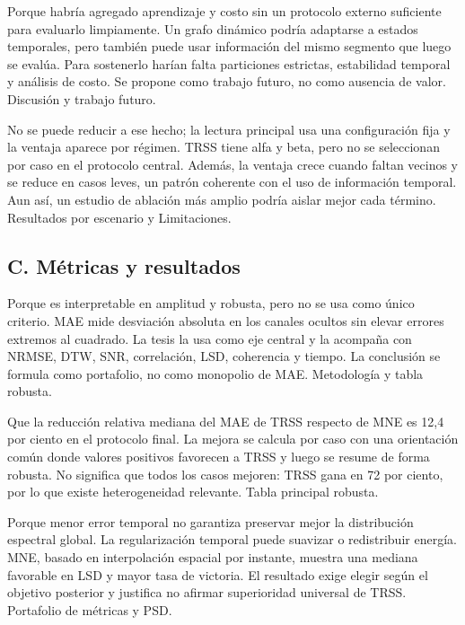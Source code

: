 {Porque habría agregado aprendizaje y costo sin un protocolo externo suficiente para evaluarlo limpiamente.}
{Un grafo dinámico podría adaptarse a estados temporales, pero también puede usar información del mismo segmento que luego se evalúa. Para sostenerlo harían falta particiones estrictas, estabilidad temporal y análisis de costo. Se propone como trabajo futuro, no como ausencia de valor.}
{Discusión y trabajo futuro.}

{No se puede reducir a ese hecho; la lectura principal usa una configuración fija y la ventaja aparece por régimen.}
{TRSS tiene alfa y beta, pero no se seleccionan por caso en el protocolo central. Además, la ventaja crece cuando faltan vecinos y se reduce en casos leves, un patrón coherente con el uso de información temporal. Aun así, un estudio de ablación más amplio podría aislar mejor cada término.}
{Resultados por escenario y Limitaciones.}

\subsection*{C. Métricas y resultados}

{Porque es interpretable en amplitud y robusta, pero no se usa como único criterio.}
{MAE mide desviación absoluta en los canales ocultos sin elevar errores extremos al cuadrado. La tesis la usa como eje central y la acompaña con NRMSE, DTW, SNR, correlación, LSD, coherencia y tiempo. La conclusión se formula como portafolio, no como monopolio de MAE.}
{Metodología y tabla robusta.}

{Que la reducción relativa mediana del MAE de TRSS respecto de MNE es 12,4 por ciento en el protocolo final.}
{La mejora se calcula por caso con una orientación común donde valores positivos favorecen a TRSS y luego se resume de forma robusta. No significa que todos los casos mejoren: TRSS gana en 72 por ciento, por lo que existe heterogeneidad relevante.}
{Tabla principal robusta.}

{Porque menor error temporal no garantiza preservar mejor la distribución espectral global.}
{La regularización temporal puede suavizar o redistribuir energía. MNE, basado en interpolación espacial por instante, muestra una mediana favorable en LSD y mayor tasa de victoria. El resultado exige elegir según el objetivo posterior y justifica no afirmar superioridad universal de TRSS.}
{Portafolio de métricas y PSD.}

